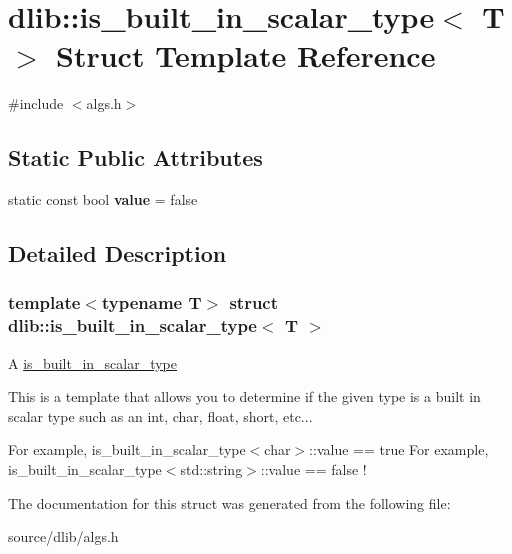 \hypertarget{structdlib_1_1is__built__in__scalar__type}{
\section{dlib::is\_\-built\_\-in\_\-scalar\_\-type$<$ T $>$ Struct Template Reference}
\label{structdlib_1_1is__built__in__scalar__type}
}


{\ttfamily \#include $<$algs.h$>$}\subsection*{Static Public Attributes}
\begin{DoxyCompactItemize}
\item 
\hypertarget{structdlib_1_1is__built__in__scalar__type_a25f19ea2e573cc6e32ee7f7e5b0ea0bc}{
static const bool {\bfseries value} = false}
\label{structdlib_1_1is__built__in__scalar__type_a25f19ea2e573cc6e32ee7f7e5b0ea0bc}

\end{DoxyCompactItemize}


\subsection{Detailed Description}
\subsubsection*{template$<$typename T$>$ struct dlib::is\_\-built\_\-in\_\-scalar\_\-type$<$ T $>$}

A \hyperlink{structdlib_1_1is__built__in__scalar__type}{is\_\-built\_\-in\_\-scalar\_\-type}

This is a template that allows you to determine if the given type is a built in scalar type such as an int, char, float, short, etc...

For example, is\_\-built\_\-in\_\-scalar\_\-type$<$char$>$::value == true For example, is\_\-built\_\-in\_\-scalar\_\-type$<$std::string$>$::value == false ! 

The documentation for this struct was generated from the following file:\begin{DoxyCompactItemize}
\item 
source/dlib/algs.h\end{DoxyCompactItemize}
